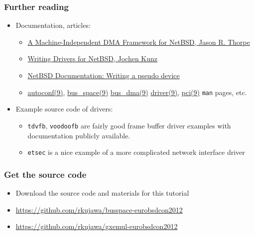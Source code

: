 \documentclass[dvipsnames,table]{beamer}
\begin{document}
\begin{frame}
\frametitle{Further reading}
\begin{itemize}
	\item Documentation, articles:
	\begin{itemize}
		\item \href{http://www.netbsd.org/docs/kernel/bus_dma.pdf}{A Machine-Independent DMA Framework for NetBSD, Jason R. Thorpe}
		\item \href{ftp://ftp.netbsd.org/pub/NetBSD/misc/ddwg/NetBSD-driver_writing-1.0.1e.pdf}{Writing Drivers for NetBSD, Jochen Kunz}
		\item \href{http://www.netbsd.org/docs/kernel/pseudo/}{NetBSD Documentation: Writing a pseudo device}
		\item \href{http://netbsd.gw.com/cgi-bin/man-cgi?autoconf+9+NetBSD-current}{autoconf(9)}, 
			\href{http://netbsd.gw.com/cgi-bin/man-cgi?bus_space+9+NetBSD-current}{bus\_space(9)}
			\href{http://netbsd.gw.com/cgi-bin/man-cgi?bus_dma+9+NetBSD-current}{bus\_dma(9)} 
			\href{http://netbsd.gw.com/cgi-bin/man-cgi?driver+9+NetBSD-current}{driver(9)}, 
			\href{http://netbsd.gw.com/cgi-bin/man-cgi?pci+9+NetBSD-current}{pci(9)}
			{\tt man} pages, etc.
	\end{itemize}
	\item Example source code of drivers:
	\begin{itemize}
		\item {\tt tdvfb}, {\tt voodoofb} are fairly good frame buffer driver examples with documentation publicly available.
		\item {\tt etsec} is a nice example of a more complicated network interface driver
	\end{itemize}
\end{itemize}

\end{frame}

\begin{frame}
\frametitle{Get the source code}

\begin{itemize}
	\item Download the source code and materials for this tutorial
	\item {\small\url{https://github.com/rkujawa/busspace-eurobsdcon2012}}
	\item {\small\url{https://github.com/rkujawa/gxemul-eurobsdcon2012}}
\end{itemize}
\end{frame}
\end{document}
